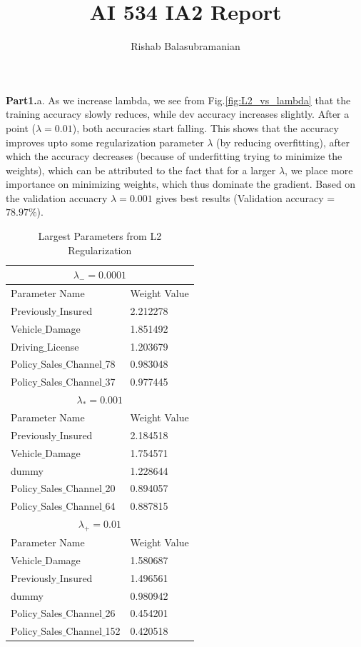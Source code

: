 \documentclass{article}
\title{AI 534 IA2 Report}
\author{Rishab Balasubramanian}
\date{}
\begin{document}
\maketitle
\textbf{Part1.}a. As we increase lambda, we see from Fig.\ref{fig:L2_vs_lambda} that the training accuracy slowly reduces, while dev accuracy increases slightly. After a point ($\lambda=0.01$), both accuracies start falling. This shows that the accuracy improves upto some regularization parameter $\lambda$ (by reducing overfitting), after which the accuracy decreases (because of underfitting trying to minimize the weights), which can be attributed to the fact that for a larger $\lambda$, we place more importance on minimizing weights, which thus dominate the gradient. Based on the validation accuacry $\lambda=0.001$ gives best results (Validation accuracy = $78.97\%$).\\

\begin{table}[h]
\caption{Largest Parameters from L2 Regularization}
\begin{tabular}{ |p{6cm}||p{6cm}|  }
 \hline
 \multicolumn{2}{|c|}{$\lambda_{-} = 0.0001$} \\
 \hline
 Parameter Name & Weight Value\\
 \hline
Previously$\_$Insured  &     2.212278\\
Vehicle$\_$Damage      &     1.851492\\
Driving$\_$License      &    1.203679\\
Policy$\_$Sales$\_$Channel$\_$78 & 0.983048\\
Policy$\_$Sales$\_$Channel$\_$37 & 0.977445\\
 \hline
 \multicolumn{2}{|c|}{$\lambda_{*} = 0.001$} \\
 \hline
 Parameter Name & Weight Value\\
 \hline
Previously$\_$Insured   &    2.184518\\
Vehicle$\_$Damage        &   1.754571\\
dummy                  &  1.228644\\
Policy$\_$Sales$\_$Channel$\_$20 & 0.894057\\
Policy$\_$Sales$\_$Channel$\_$64  &0.887815\\
\hline
\multicolumn{2}{|c|}{$\lambda_{+} = 0.01$} \\
 \hline
 Parameter Name & Weight Value\\
 \hline
Vehicle$\_$Damage        &    1.580687\\
Previously$\_$Insured     &   1.496561\\
dummy                   &  0.980942\\
Policy$\_$Sales$\_$Channel$\_$26  & 0.454201\\
Policy$\_$Sales$\_$Channel$\_$152 & 0.420518\\
\hline
\end{tabular}
\label{table:L2}
\end{table}
\vspace{\baselineskip}
\end{document}
